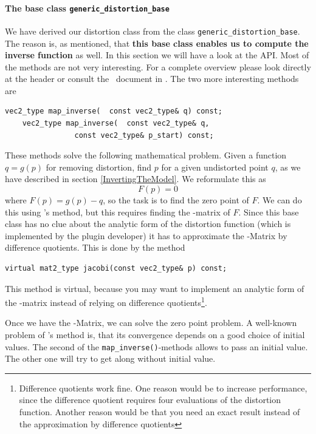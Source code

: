 \documentclass[10pt,a4paper]{article}
\begin{document}
\paragraph{The base class {\tt generic\_distortion\_base}}
We have derived our distortion class from the class {\tt generic\_distortion\_base}.
The reason is, as mentioned, that {\bf this base class enables us to compute
the inverse function} as well. In this section we will have a look at the API.
Most of the methods are not very interesting. For a complete overview
please look directly at the header or consult the \doxygen\ document in
.
The two more interesting methods are
\begin{lstlisting}[language=mycpp,tabsize=8]
	vec2_type map_inverse(	const vec2_type& q) const;
	vec2_type map_inverse(	const vec2_type& q,
				const vec2_type& p_start) const;
\end{lstlisting}
These methods solve the following mathematical problem.
Given a function $q = g(p)$ for removing distortion, find $p$
for a given undistorted point $q$, as we have described in section \ref{InvertingTheModel}. We reformulate this as
\begin{equation}
F(p) = 0
\end{equation}
where $F(p) = g(p) - q$, so the task is to find the zero point of $F$.
We can do this using \Newton's method, but this requires finding the
\Jacobi-matrix of $F$. Since this base class has no clue about the analytic
form of the distortion function (which is implemented by the plugin developer)
it has to approximate the \Jacobi-Matrix by difference quotients.
This is done by the method
\begin{lstlisting}[language=mycpp,tabsize=8]
	virtual mat2_type jacobi(const vec2_type& p) const;
\end{lstlisting}
This method is virtual, because you may want to implement an analytic form of
the \Jacobi-matrix instead of relying on difference
quotients\footnote{Difference quotients work fine.
One reason would be to increase performance, since the difference quotient
requires four evaluations of the distortion function.
Another reason would be that you need an exact result instead of the approximation
by difference quotients}.

Once we have the \Jacobi-Matrix, we can solve the zero point problem.
A well-known problem of \Newton's method is, that its convergence
depends on a good choice of initial values.
The second of the {\tt map\_inverse()}-methods allows to pass an initial value.
The other one will try to get along without initial value.
\end{document}

